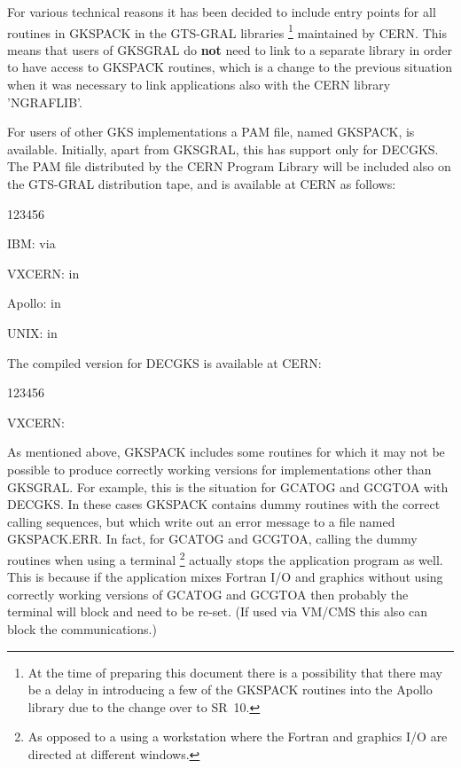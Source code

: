 For various technical reasons it has been decided to include entry points
for all routines in GKSPACK in the GTS-GRAL libraries%
\footnote{At the time of preparing this document there
is a possibility that there may be
a delay in introducing a few of the GKSPACK routines into
the Apollo library due to the change over to SR~10.}
maintained by CERN.
This means that users of GKSGRAL do {\bf not} need to link to a separate
library in order to have access to GKSPACK routines, which is a change to the
previous situation when it was necessary to link applications
also with the CERN library 'NGRAFLIB'.
 
For users of other GKS implementations a PAM file, named GKSPACK,
is available.
Initially, apart from GKSGRAL, this has support only for DECGKS.
The PAM file distributed by the CERN Program Library will be
included also on the GTS-GRAL distribution tape, and is available at CERN
as follows:
\begin{DLtt}{123456}
\item[IBM:]via 
\item[VXCERN:]in 
\item[Apollo:]in 
\item[UNIX:]in 
\end{DLtt}
The compiled version for DECGKS is available at CERN:
\begin{DLtt}{123456}
\item[VXCERN:] 
\end{DLtt}
 
As mentioned above, GKSPACK includes some routines for which it may not
be possible to produce correctly working versions for implementations
other than GKSGRAL.
For example, this is the situation for GCATOG and GCGTOA with DECGKS.
In these cases GKSPACK contains dummy routines with the correct
calling sequences, but which write out an error message to a file
named GKSPACK.ERR.
In fact, for GCATOG and GCGTOA, calling the dummy routines
when using a terminal%
\footnote{As opposed to a using a workstation where the
Fortran and graphics I/O are directed at different windows.}
actually stops the application program as well. This is because if the
application mixes Fortran I/O and graphics without using correctly
working versions of GCATOG and GCGTOA then probably the terminal will
block and need to be re-set.
(If used via VM/CMS this also can block the communications.)
 
